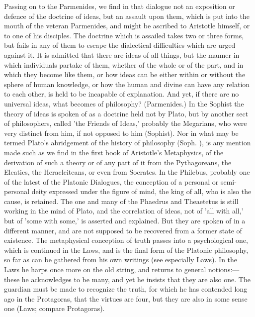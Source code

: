 \documentclass[11pt,letter]{article}
\begin{document}
\par  Passing on to the Parmenides, we find in that dialogue not an exposition or defence of the doctrine of ideas, but an assault upon them, which is put into the mouth of the veteran Parmenides, and might be ascribed to Aristotle himself, or to one of his disciples. The doctrine which is assailed takes two or three forms, but fails in any of them to escape the dialectical difficulties which are urged against it. It is admitted that there are ideas of all things, but the manner in which individuals partake of them, whether of the whole or of the part, and in which they become like them, or how ideas can be either within or without the sphere of human knowledge, or how the human and divine can have any relation to each other, is held to be incapable of explanation. And yet, if there are no universal ideas, what becomes of philosophy? (Parmenides.) In the Sophist the theory of ideas is spoken of as a doctrine held not by Plato, but by another sect of philosophers, called 'the Friends of Ideas,' probably the Megarians, who were very distinct from him, if not opposed to him (Sophist). Nor in what may be termed Plato's abridgement of the history of philosophy (Soph. ), is any mention made such as we find in the first book of Aristotle's Metaphysics, of the derivation of such a theory or of any part of it from the Pythagoreans, the Eleatics, the Heracleiteans, or even from Socrates. In the Philebus, probably one of the latest of the Platonic Dialogues, the conception of a personal or semi-personal deity expressed under the figure of mind, the king of all, who is also the cause, is retained. The one and many of the Phaedrus and Theaetetus is still working in the mind of Plato, and the correlation of ideas, not of 'all with all,' but of 'some with some,' is asserted and explained. But they are spoken of in a different manner, and are not supposed to be recovered from a former state of existence. The metaphysical conception of truth passes into a psychological one, which is continued in the Laws, and is the final form of the Platonic philosophy, so far as can be gathered from his own writings (see especially Laws). In the Laws he harps once more on the old string, and returns to general notions:—these he acknowledges to be many, and yet he insists that they are also one. The guardian must be made to recognize the truth, for which he has contended long ago in the Protagoras, that the virtues are four, but they are also in some sense one (Laws; compare Protagoras).
\end{document}
